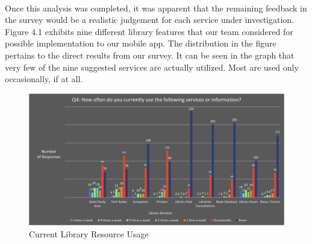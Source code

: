 \paragraph{}
Once this analysis was completed, it was apparent that the remaining feedback in the survey would be a realistic judgement for each service under investigation. Figure 4.1 exhibits nine different library features that our team considered for possible implementation to our mobile app. The distribution in the figure pertains to the direct results from our survey. It can be seen in the graph that very few of the nine suggested services are actually utilized. Most are used only occasionally, if at all.

 \begin{figure}[H]
        \centering
        \includegraphics[width = \textwidth, height = \textheight, keepaspectratio]{assets/img/Student Survey Results Q4.png}
         \caption{Current Library Resource Usage}
    \end{figure}

